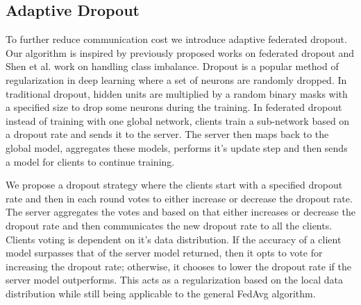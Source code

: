 \documentclass{article}
\begin{document}
\subsection{Adaptive Dropout}

To further reduce communication cost we introduce adaptive federated dropout. Our algorithm is inspired by previously proposed works on federated dropout\cite{wen2022federated,nader2020adaptive,caldas2018expanding} and Shen et al. \cite{shen2021agnostic} work on handling class imbalance. Dropout is a popular method of regularization in deep learning where a set of neurons are randomly dropped. In traditional dropout, hidden units are multiplied by a random binary masks with a specified size to drop some neurons during the training. In federated dropout instead of training with one global network, clients train a sub-network based on a dropout rate and sends it to the server. The server then maps back to the global model, aggregates these models, performs it's update step and then sends a model for clients to continue training. 

We propose a dropout strategy where the clients start with a specified dropout rate and then in each round votes to either increase or decrease the dropout rate. The server aggregates the votes and based on that either increases or decrease the dropout rate and then communicates the new dropout rate to all the clients. Clients voting is dependent on it's data distribution. If the accuracy of a client model surpasses that of the server model returned, then it opts to vote for increasing the dropout rate; otherwise, it chooses to lower the dropout rate if the server model outperforms. This acts as a regularization based on the local data distribution while still being applicable to the general FedAvg algorithm. 
\end{document}
